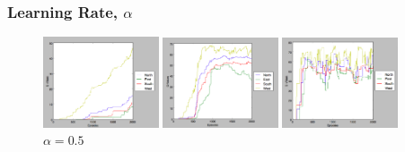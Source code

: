 \documentclass{beamer}
\begin{document}
\begin{frame}
	\frametitle{Learning Rate, $\alpha$}
\begin{figure}
	\begin{minipage}{.32\textwidth}
		\includegraphics[width=3.4cm]{Images/25a03g9}
			\caption{$\alpha = 0.03$}
	\end{minipage}
	\begin{minipage}{0.32\textwidth}
		\includegraphics[width=3.4cm]{Images/25a1g9}
			\caption{$\alpha = 0.1$}
	\end{minipage}
	\begin{minipage}{0.32\textwidth}
		\includegraphics[width=3.4cm]{Images/25a5g9}
			\caption{$\alpha = 0.5$}
	\end{minipage}
\end{figure}
\end{frame}
\end{document}
